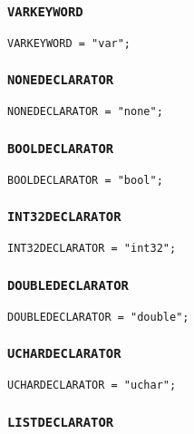 \documentclass[12pt, a4paper]{article}
\begin{document}
\subsubsection{\texttt{VARKEYWORD}}

\begin{verbatim}
VARKEYWORD = "var";
\end{verbatim}

\subsubsection{\texttt{NONEDECLARATOR}}

\begin{verbatim}
NONEDECLARATOR = "none";
\end{verbatim}

\subsubsection{\texttt{BOOLDECLARATOR}}

\begin{verbatim}
BOOLDECLARATOR = "bool";
\end{verbatim}

\subsubsection{\texttt{INT32DECLARATOR}}

\begin{verbatim}
INT32DECLARATOR = "int32";
\end{verbatim}

\subsubsection{\texttt{DOUBLEDECLARATOR}}

\begin{verbatim}
DOUBLEDECLARATOR = "double";
\end{verbatim}

\subsubsection{\texttt{UCHARDECLARATOR}}

\begin{verbatim}
UCHARDECLARATOR = "uchar";
\end{verbatim}

\subsubsection{\texttt{LISTDECLARATOR}}
\end{document}
